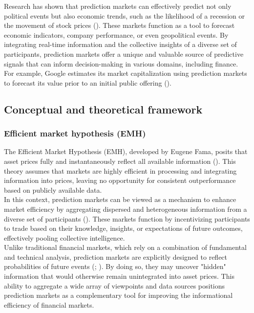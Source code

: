 \documentclass[12pt]{report}
\begin{document}
Research has shown that prediction markets can effectively predict not only political events but also economic trends, such as the likelihood of a recession or the movement of stock prices (\cite{wolfers_prediction_2004}). These markets function as a tool to forecast economic indicators, company performance, or even geopolitical events. By integrating real-time information and the collective insights of a diverse set of participants, prediction markets offer a unique and valuable source of predictive signals that can inform decision-making in various domains, including finance. For example, Google estimates its market capitalization using prediction markets to forecast its value prior to an initial public offering (\cite{berg_searching_2009}).


\subsection{Conceptual and theoretical framework}

\subsubsection{Efficient market hypothesis (EMH)}

The Efficient Market Hypothesis (EMH), developed by Eugene Fama, posits that asset prices fully and instantaneously reflect all available information (\cite{naseer_efficient_2016}). This theory assumes that markets are highly efficient in processing and integrating information into prices, leaving no opportunity for consistent outperformance based on publicly available data.\\

In this context, prediction markets can be viewed as a mechanism to enhance market efficiency by aggregating dispersed and heterogeneous information from a diverse set of participants (\cite{downey_efficient_2024}). These markets function by incentivizing participants to trade based on their knowledge, insights, or expectations of future outcomes, effectively pooling collective intelligence.\\

Unlike traditional financial markets, which rely on a combination of fundamental and technical analysis, prediction markets are explicitly designed to reflect probabilities of future events (\cite{nti_systematic_2020}; \cite{naseer_efficient_2016}). By doing so, they may uncover "hidden" information that would otherwise remain unintegrated into asset prices. This ability to aggregate a wide array of viewpoints and data sources positions prediction markets as a complementary tool for improving the informational efficiency of financial markets.
\end{document}
